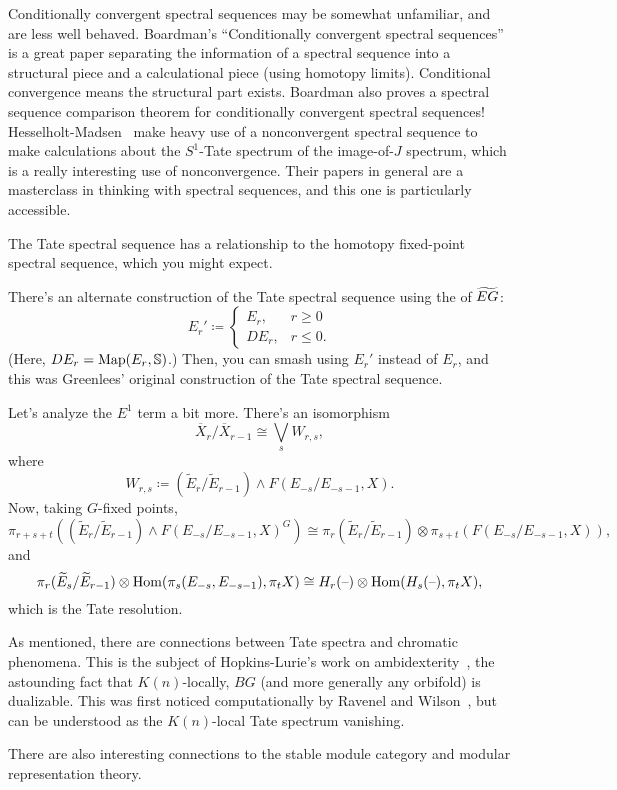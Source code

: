\begin{rem}
Conditionally convergent spectral sequences may be somewhat unfamiliar, and are less well behaved.  Boardman's
``Conditionally convergent spectral sequences''~\cite{BoardmanCCSS} is a great paper separating the information of
a spectral sequence into a structural piece and a calculational piece (using homotopy limits). Conditional
convergence means the structural part exists. Boardman also proves a spectral sequence comparison theorem for
conditionally convergent spectral sequences! Hesselholt-Madsen~\cite{HM92} make heavy use of a nonconvergent
spectral sequence to make calculations about the $S^1$-Tate spectrum of the image-of-$J$ spectrum, which is a
really interesting use of nonconvergence. Their papers in general are a masterclass in thinking with spectral
sequences, and this one is particularly accessible.
\end{rem}
The Tate spectral sequence has a relationship to the homotopy fixed-point spectral sequence, which you might
expect.

There's an alternate construction of the Tate spectral sequence using the  of $\widetilde{EG}$:
\[E_r'\coloneqq \begin{cases}
	E_r, &r\ge 0\\
	DE_r, &r\le 0.
\end{cases}\]
(Here, $DE_r = \operatorname{Map}(E_r, \mathbb S)$.) Then, you can smash using $E_r'$ instead of $E_r$, and this was Greenlees'
original construction of the Tate spectral sequence.

Let's analyze the $E^1$ term a bit more. There's an isomorphism
\[\overline X_r/\overline X_{r-1}\cong\bigvee_s W_{r,s},\]
where
\[W_{r,s}\coloneqq (\widetilde E_r/\widetilde E_{r-1})\wedge F(E_{-s}/E_{-s-1}, X).\]
Now, taking $G$-fixed points,
\[\pi_{r+s+t}((\widetilde E_r/\widetilde E_{r-1})\wedge F(E_{-s}/E_{-s-1}, X)^G)\cong \pi_r(\widetilde
E_r/\widetilde E_{r-1})\otimes \pi_{s+t}(F(E_{-s}/E_{-s-1}, X)),\]
and
\[\pi_r(\widetilde E_s/\widetilde E_{r-1})\otimes\operatorname{Hom}(\pi_s(E_{-s}, E_{-s-1}), \pi_tX)\cong
H_r(\text{--})\otimes\operatorname{Hom}(H_s(\text{--}), \pi_tX),\]
which is the Tate resolution.
\begin{rem}
As mentioned, there are connections between Tate spectra and chromatic phenomena. This is the subject of
Hopkins-Lurie's work on ambidexterity~\cite{Ambidexterity}, the astounding fact that $K(n)$-locally, $\mathit{BG}$
(and more generally any orbifold) is dualizable. This was first noticed computationally by Ravenel and
Wilson~\cite{RavenelWilson}, but can be understood as the $K(n)$-local Tate spectrum vanishing.

There are also interesting connections to the stable module category and modular representation theory.
\end{rem}
